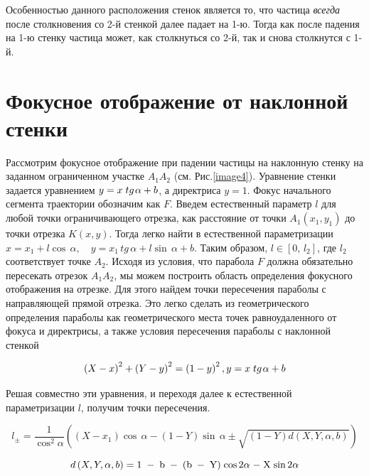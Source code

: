 \documentclass[a4paper]{article}
\begin{document}
Особенностью данного расположения стенок является то, что частица \textit{всегда} после столкновения со 2-й стенкой далее падает на 1-ю. Тогда как после падения на 1-ю стенку частица может, как столкнуться со 2-й, так и снова столкнутся с 1-й.


\section{Фокусное отображение от наклонной стенки}

Рассмотрим фокусное отображение при падении частицы на наклонную стенку на заданном ограниченном участке $A_{1} A_{2} $ (см. Рис.\ref{image4}). Уравнение стенки задается уравнением $y=x\; tg{\kern 1pt} \alpha +b$, а директриса $y=1$. Фокус начального сегмента траектории обозначим как $F$. Введем естественный параметр $l$ для любой точки ограничивающего отрезка, как расстояние от точки $A_{1} \left(x_{1} ,y_{1} \right)$ до точки отрезка $K\left(x,y\right)$. Тогда легко найти в естественной параметризации $x=x_{1} +l\cos \, \alpha ,\quad y=x_{1} \, tg\, \alpha +l\sin \, \alpha +b$. Таким образом, $l\in \left[0,\, l_{2} \right]$, где $l_{2} $ соответствует точке $A_{2} $. Исходя из условия, что парабола $F$ должна обязательно пересекать отрезок $A_{1} A_{2} $, мы можем построить область определения фокусного отображения на отрезке. Для этого найдем точки пересечения параболы с направляющей прямой отрезка. Это легко сделать из геометрического определения параболы как геометрического места точек равноудаленного от фокуса и директрисы, а также условия пересечения параболы с наклонной стенкой

\begin{equation} \label{GrindEQ__1_} \left(X-x\right)^{2} +\left(Y-y\right)^{2} =\left(1-y\right)^{2}  , y=x\; tg{\kern 1pt} \alpha +b \end{equation}

Решая совместно эти уравнения, и переходя далее к естественной параметризации $l$, получим точки пересечения.

\begin{equation} \label{GrindEQ__2_}  l_{\pm } =\frac{1}{\cos ^{2} \alpha } \left(\left(X-x_{1} \right)\cos \, \alpha -\left(1-Y\right)\sin \, \alpha \pm \sqrt{\left(1-Y\right)d\left(X,Y,\alpha ,b\right)} \right)\end{equation}

\[d\left(X,Y,\alpha ,b\right)={\rm 1\; -\; b\; -\; (b\; -\; Y)\; cos}\, {\rm 2}\alpha {\rm \; -\; X\; sin}\, {\rm 2}\alpha \]
\end{document}
